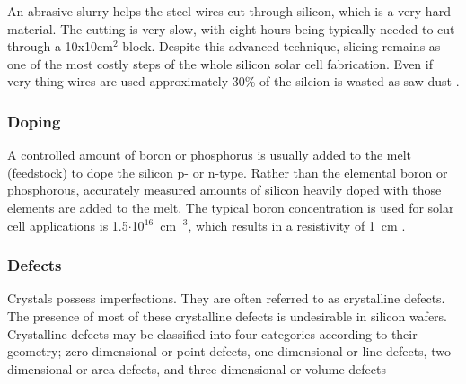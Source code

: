 An abrasive slurry helps the steel wires cut through silicon, which is a very hard material. The cutting is very slow, with eight hours being typically needed to cut through a 10x10cm$^2$ block. Despite this advanced technique, slicing remains as one of the most costly steps of the whole silicon solar cell fabrication. Even if very thing wires are used approximately 30\% of the silcion is wasted as saw dust \cite{solar_cells}.


\subsubsection{Doping}

A controlled amount of boron or phosphorus is usually added to the melt (feedstock) to dope the silicon p- or n-type. Rather than the elemental boron or phosphorous, accurately measured amounts of silicon heavily doped with those elements are added to the melt. The typical boron concentration is used for solar cell applications is 1.5$\cdot$10$^{16}$~cm$^{-3}$, which results in a resistivity of 1~\ohm cm \cite{solar_cells}.


\subsubsection{Defects}

Crystals possess imperfections. They are often referred to as crystalline defects. The presence of most of these crystalline defects is undesirable in silicon wafers. Crystalline defects may be classified into four categories according to their geometry; zero-dimensional or point defects, one-dimensional or line defects, two-dimensional or area defects, and three-dimensional or volume defects


